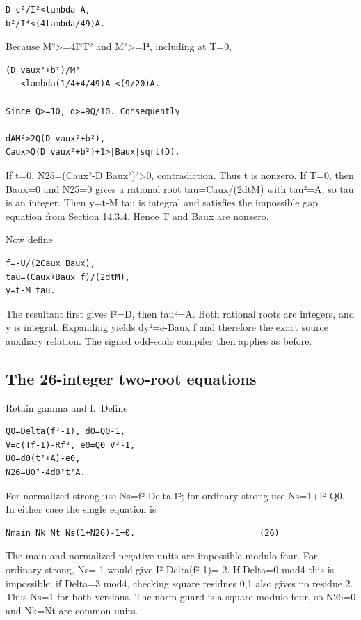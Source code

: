 \documentclass[
  10pt,
]{article}
\begin{document}
\begin{verbatim}
D c²/I²<lambda A,
b²/I⁴<(4lambda/49)A.
\end{verbatim}

Because M²\textgreater=4I²T² and M²\textgreater=I⁴, including at T=0,

\begin{verbatim}
(D vaux²+b²)/M²
   <lambda(1/4+4/49)A <(9/20)A.

Since Q>=10, d>=9Q/10. Consequently

dAM²>2Q(D vaux²+b²),
Caux>Q(D vaux²+b²)+1>|Baux|sqrt(D).
\end{verbatim}

If t=0, N25=(Caux²-D Baux²)²\textgreater0, contradiction. Thus t is
nonzero. If T=0, then Baux=0 and N25=0 gives a rational root
tau=Caux/(2dtM) with tau²=A, so tau is an integer. Then y=t-M tau is
integral and satisfies the impossible gap equation from Section 14.3.4.
Hence T and Baux are nonzero.

Now define

\begin{verbatim}
f=-U/(2Caux Baux),
tau=(Caux+Baux f)/(2dtM),
y=t-M tau.
\end{verbatim}

The resultant first gives f²=D, then tau²=A. Both rational roots are
integers, and y is integral. Expanding yields dy²=e-Baux f and therefore
the exact source auxiliary relation. The signed odd-scale compiler then
applies as before.

\subsection{The 26-integer two-root
equations}\label{the-26-integer-two-root-equations}

Retain gamma and f.~Define

\begin{verbatim}
Q0=Delta(f²-1), d0=Q0-1,
V=c(Tf-1)-Rf², e0=Q0 V²-1,
U0=d0(t²+A)-e0,
N26=U0²-4d0²t²A.
\end{verbatim}

For normalized strong use Ns=f²-Delta I²; for ordinary strong use
Ns=1+I²-Q0. In either case the single equation is

\begin{verbatim}
Nmain Nk Nt Ns(1+N26)-1=0.                         (26)
\end{verbatim}

The main and normalized negative units are impossible modulo four. For
ordinary strong, Ns=-1 would give I²-Delta(f²-1)=-2. If Delta=0 mod4
this is impossible; if Delta=3 mod4, checking square residues 0,1 also
gives no residue 2. Thus Ns=1 for both versions. The norm guard is a
square modulo four, so N26=0 and Nk=Nt are common units.
\end{document}
